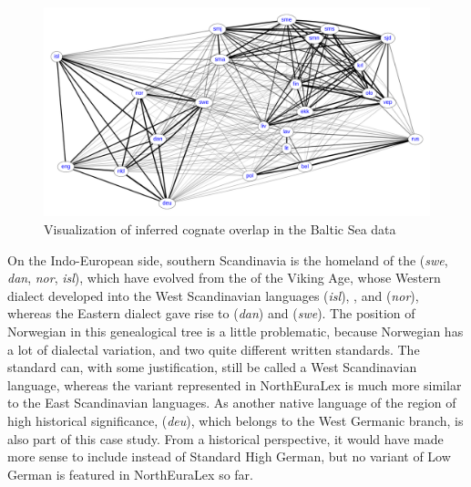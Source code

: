 \begin{figure}
\includegraphics[width=\textwidth]{figures/cognacy-strength-baltic.pdf}
\caption{Visualization of inferred cognate overlap in the Baltic Sea data}
\label{baltic-cognacy}
\end{figure}

On the Indo-European side, southern Scandinavia is the homeland of the  (\textit{swe}, \textit{dan}, \textit{nor}, \textit{isl}), which have evolved from the  of the Viking Age, whose Western dialect developed into the West Scandinavian languages  (\textit{isl}), , and  (\textit{nor}), whereas the Eastern dialect gave rise to  (\textit{dan}) and  (\textit{swe}). The position of Norwegian in this genealogical tree is a little problematic, because Norwegian has a lot of dialectal variation, and two quite different written standards. The  standard can, with some justification, still be called a West Scandinavian language, whereas the  variant represented in NorthEuraLex is much more similar to the East Scandinavian languages. As another native language of the region of high historical significance,  (\textit{deu}), which belongs to the West Germanic branch, is
also part of this case study. From a historical perspective, it would have made more sense to include  instead of Standard High German, but no variant of Low German is featured in NorthEuraLex so far.

